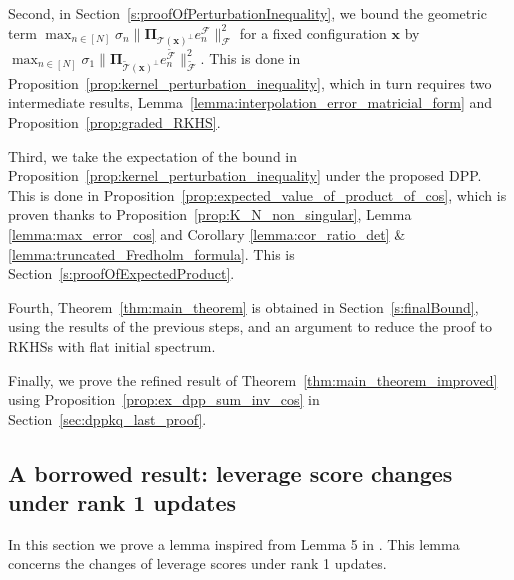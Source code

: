 \documentclass[twoside,11pt]{book}
\numberwithin{theorem}{chapter}
\numberwithin{definition}{chapter}
\numberwithin{proposition}{chapter}
\numberwithin{corollary}{chapter}
\numberwithin{example}{chapter}
\numberwithin{lemma}{chapter}
\numberwithin{assumption}{chapter}
\begin{document}
Second, in Section~\ref{s:proofOfPerturbationInequality}, we bound the geometric term $\max_{n \in [N]} \sigma_{n} \|\bm{\Pi}_{\mathcal{T}(\bm{x})^{\perp}} e_{n}^{\mathcal{F}}\|_{\mathcal{F}}^{2}$ for a fixed configuration $\bm{x}$ by $\max_{n \in [N]} \sigma_{1} \|\bm{\Pi}_{\tilde{\mathcal{T}}(\bm{x})^{\perp}} e_{n}^{\tilde{\mathcal{F}}}\|_{\tilde{\mathcal{F}}}^{2}$. This is done in Proposition~\ref{prop:kernel_perturbation_inequality}, which in turn requires two intermediate results, Lemma~\ref{lemma:interpolation_error_matricial_form} and Proposition~\ref{prop:graded_RKHS}.


Third, we take the expectation of the bound in Proposition~\ref{prop:kernel_perturbation_inequality} under the proposed DPP. This is done in Proposition~\ref{prop:expected_value_of_product_of_cos}, which is proven thanks to Proposition~\ref{prop:K_N_non_singular}, Lemma \ref{lemma:max_error_cos} and Corollary \ref{lemma:cor_ratio_det} \& \ref{lemma:truncated_Fredholm_formula}. This is Section~\ref{s:proofOfExpectedProduct}.



Fourth, Theorem~\ref{thm:main_theorem} is obtained in Section~\ref{s:finalBound}, using the results of the previous steps, and an argument to reduce the proof to RKHSs with flat initial spectrum.

Finally, we prove the refined result of Theorem~\ref{thm:main_theorem_improved} using Proposition~\ref{prop:ex_dpp_sum_inv_cos} in Section~\ref{sec:dppkq_last_proof}.  


\subsection{A borrowed result: leverage score changes under rank 1 updates} \label{subsec:lv_score_updates}


In this section we prove a lemma inspired from Lemma 5 in \cite{Coh15}. This lemma concerns the changes of leverage scores under rank 1 updates.
\end{document}
